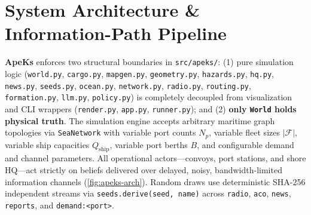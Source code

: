 \documentclass[11pt,a4paper,oneside]{report}
\begin{document}
\section{System Architecture \& Information-Path Pipeline}
\textbf{ApeKs} enforces two structural boundaries in \texttt{src/apeks/}: (1) pure simulation logic (\texttt{world.py}, \texttt{cargo.py}, \texttt{mapgen.py}, \texttt{geometry.py}, \texttt{hazards.py}, \texttt{hq.py}, \texttt{news.py}, \texttt{seeds.py}, \texttt{ocean.py}, \texttt{network.py}, \texttt{radio.py}, \texttt{routing.py}, \texttt{formation.py}, \texttt{llm.py}, \texttt{policy.py}) is completely decoupled from visualization and CLI wrappers (\texttt{render.py}, \texttt{app.py}, \texttt{runner.py}); and (2) \textbf{only \texttt{World} holds physical truth}. The simulation engine accepts arbitrary maritime graph topologies via \texttt{SeaNetwork} with variable port counts $N_p$, variable fleet sizes $|\mathcal{F}|$, variable ship capacities $Q_{\text{ship}}$, variable port berths $B$, and configurable demand and channel parameters. All operational actors---convoys, port stations, and shore HQ---act strictly on beliefs delivered over delayed, noisy, bandwidth-limited information channels (\autoref{fig:apeks-arch}). Random draws use deterministic SHA-256 independent streams via \texttt{seeds.derive(seed, name)} across \texttt{radio}, \texttt{aco}, \texttt{news}, \texttt{reports}, and \texttt{demand:<port>}.
\end{document}
